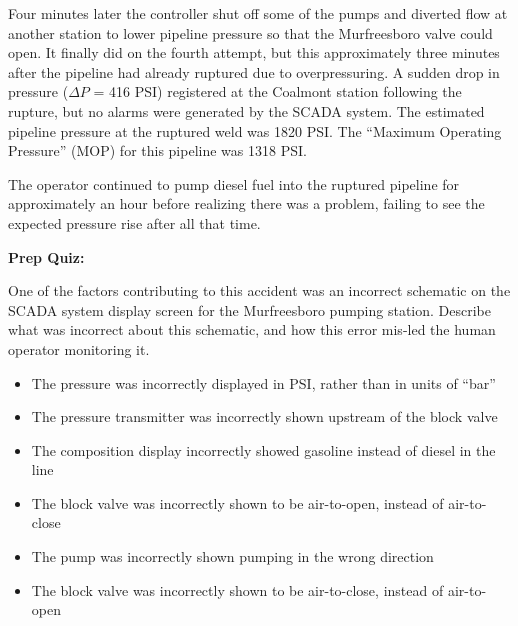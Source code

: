 \vskip 10pt

Four minutes later the controller shut off some of the pumps and diverted flow at another station to lower pipeline pressure so that the Murfreesboro valve could open.  It finally did on the fourth attempt, but this approximately three minutes after the pipeline had already ruptured due to overpressuring.  A sudden drop in pressure ($\Delta P$ = 416 PSI) registered at the Coalmont station following the rupture, but no alarms were generated by the SCADA system.  The estimated pipeline pressure at the ruptured weld was 1820 PSI.  The ``Maximum Operating Pressure'' (MOP) for this pipeline was 1318 PSI.

The operator continued to pump diesel fuel into the ruptured pipeline for approximately an hour before realizing there was a problem, failing to see the expected pressure rise after all that time.
















\vfil \eject

\noindent
{\bf Prep Quiz:}

One of the factors contributing to this accident was an incorrect schematic on the SCADA system display screen for the Murfreesboro pumping station.  Describe what was incorrect about this schematic, and how this error mis-led the human operator monitoring it.

\begin{itemize}
\item{} The pressure was incorrectly displayed in PSI, rather than in units of ``bar''
\vskip 5pt 
\item{} The pressure transmitter was incorrectly shown upstream of the block valve
\vskip 5pt 
\item{} The composition display incorrectly showed gasoline instead of diesel in the line
\vskip 5pt 
\item{} The block valve was incorrectly shown to be air-to-open, instead of air-to-close
\vskip 5pt 
\item{} The pump was incorrectly shown pumping in the wrong direction
\vskip 5pt 
\item{} The block valve was incorrectly shown to be air-to-close, instead of air-to-open
\end{itemize}






